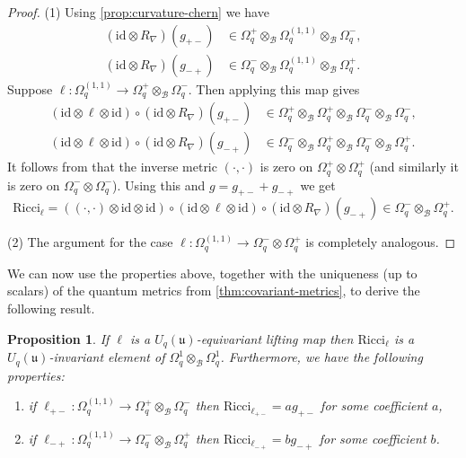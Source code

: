 \documentclass[a4paper,12pt,reqno,english]{amsart}
\numberwithin{equation}{section}
\numberwithin{figure}{section}
\theoremstyle{plain}
\theoremstyle{plain}
\theoremstyle{plain}
\newtheorem{proposition}[theorem]{Proposition}
\theoremstyle{plain}
\theoremstyle{plain}
\theoremstyle{definition}
\theoremstyle{definition}
\theoremstyle{definition}
\theoremstyle{remark}
\theoremstyle{definition}
\newcommand{\Uqu}{U_q(\mathfrak{u})}
\newcommand{\qalg}{\mathcal{B}}
\newcommand{\id}{\mathrm{id}}
\newcommand{\Ricci}{\mathrm{Ricci}}
\newcommand{\liftmap}{\ell}
\newcommand{\diffcalc}{\Omega_q}
\begin{document}
\begin{proof}
(1) Using \cref{prop:curvature-chern} we have
\[
\begin{split}
(\id \otimes R_\nabla)(g_{+ -}) & \in \diffcalc^+ \otimes_\qalg \diffcalc^{(1, 1)} \otimes_\qalg \diffcalc^-, \\
(\id \otimes R_\nabla)(g_{- +}) & \in \diffcalc^- \otimes_\qalg \diffcalc^{(1, 1)} \otimes_\qalg \diffcalc^+.
\end{split}
\]
Suppose $\liftmap : \diffcalc^{(1, 1)} \to \diffcalc^+ \otimes_\qalg \diffcalc^-$. Then applying this map gives
\[
\begin{split}
(\id \otimes \liftmap \otimes \id) \circ (\id \otimes R_\nabla)(g_{+ -}) & \in \diffcalc^+ \otimes_\qalg \diffcalc^+ \otimes_\qalg \diffcalc^- \otimes_\qalg \diffcalc^-, \\
(\id \otimes \liftmap \otimes \id) \circ (\id \otimes R_\nabla)(g_{- +}) & \in \diffcalc^- \otimes_\qalg \diffcalc^+ \otimes_\qalg \diffcalc^- \otimes_\qalg \diffcalc^+.
\end{split}
\]
It follows from \cite[Theorem 3.6]{levicivita-irreducible} that the inverse metric $(\cdot, \cdot)$ is zero on $\diffcalc^+ \otimes \diffcalc^+$ (and similarly it is zero on $\diffcalc^- \otimes \diffcalc^-$).
Using this and $g = g_{+ -} + g_{- +}$ we get
\[
\Ricci_\liftmap = ((\cdot, \cdot) \otimes \id \otimes \id) \circ (\id \otimes \liftmap \otimes \id) \circ (\id \otimes R_\nabla)(g_{- +}) \in \diffcalc^- \otimes_\qalg \diffcalc^+.
\]

(2) The argument for the case $\liftmap : \diffcalc^{(1, 1)} \to \diffcalc^- \otimes \diffcalc^+$ is completely analogous.
\end{proof}

We can now use the properties above, together with the uniqueness (up to scalars) of the quantum metrics from \cref{thm:covariant-metrics}, to derive the following result.

\begin{proposition}
\label{prop:ricci-proportional}
If $\liftmap$ is a $\Uqu$-equivariant lifting map then $\Ricci_\liftmap$ is a $\Uqu$-invariant element of $\diffcalc^1 \otimes_\qalg \diffcalc^1$. Furthermore, we have the following properties:
\begin{enumerate}
\item if $\liftmap_{+ -} : \diffcalc^{(1, 1)} \to \diffcalc^+ \otimes_\qalg \diffcalc^-$ then $\Ricci_{\liftmap_{+ -}} = a g_{+ -}$ for some coefficient $a$,
\item if $\liftmap_{- +} : \diffcalc^{(1, 1)} \to \diffcalc^- \otimes_\qalg \diffcalc^+$ then $\Ricci_{\liftmap_{- +}} = b g_{- +}$ for some coefficient $b$.
\end{enumerate}
\end{proposition}
\end{document}
